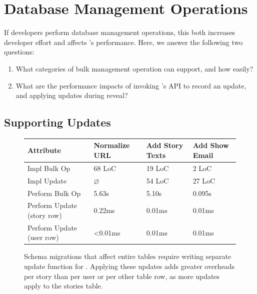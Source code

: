 \section{Database Management Operations}
\label{s:eval-updates}

%
If developers perform database management operations, this both increases
developer effort and affects \sys's performance. Here, we answer the following two questions:
\begin{enumerate}[nosep]
    \item What categories of bulk management operation can \sys support, and how
        easily? 
    \item What are the performance impacts of invoking \sys's API to record an
        update, and applying updates during reveal?
\end{enumerate}

\subsection{Supporting Updates}
\begin{figure}
    \centering
    \small
    \begin{tabular}{m{}|m{}|m{}|m{}}
        \centering\textbf{Attribute} & \textbf{Normalize URL} & \textbf{Add Story Texts} &
        \textbf{Add Show Email} \\
        \hline
        Impl Bulk Op & 68 LoC & 19 LoC & 2 LoC \\
        \hline
        Impl Update & $\varnothing$ & 54 LoC & 27 LoC \\
        \hline
        Perform Bulk Op & 5.63s & 5.10s & 0.095s\\
        \hline
        Perform Update (story row) & 0.22ms & 0.01ms & 0.01ms \\
        \hline
        Perform Update (user row) & <0.01ms & 0.01ms & 0.01ms 
    \end{tabular}
    \caption{Schema migrations that affect entire tables require
    writing separate update function for \sys. Applying these updates adds greater overheads per
    story than per user or per other table row, as more updates apply to the
    stories table.}
    \label{tab:updates}
\end{figure}

